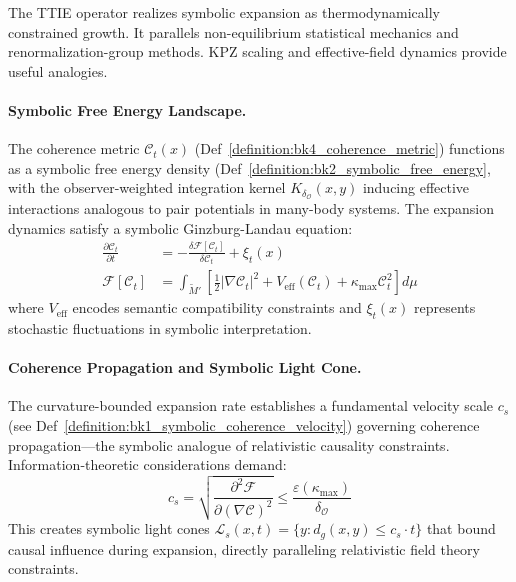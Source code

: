 \begin{demonstratio}
\label{demonstratio:bk4_symbolic_thermodynamics}

The TTIE operator realizes symbolic expansion as thermodynamically constrained
growth.
It parallels non-equilibrium statistical mechanics
and renormalization-group methods.
KPZ scaling and effective-field dynamics provide useful analogies.
  

\paragraph{Symbolic Free Energy Landscape.} 
The coherence metric $\mathcal{C}_t(x)$ (Def~\ref{definition:bk4_coherence_metric}) functions as a symbolic free energy density (Def~\ref{definition:bk2_symbolic_free_energy}, with the observer-weighted integration kernel $K_{\delta_{\mathcal{O}}}(x,y)$ inducing effective interactions analogous to pair potentials in many-body systems. The expansion dynamics satisfy a symbolic Ginzburg-Landau equation:
\begin{align}
\frac{\partial \mathcal{C}_t}{\partial t} &= -\frac{\delta \mathcal{F}[\mathcal{C}_t]}{\delta \mathcal{C}_t} + \xi_t(x) \\[4pt]
\mathcal{F}[\mathcal{C}_t] &= \int_{\widetilde{M}'} \left[ \frac{1}{2}|\nabla \mathcal{C}_t|^2 + V_{\text{eff}}(\mathcal{C}_t) + \kappa_{\max} \mathcal{C}_t^2 \right] d\mu
\end{align}
where $V_{\text{eff}}$ encodes semantic compatibility constraints and $\xi_t(x)$ represents stochastic fluctuations in symbolic interpretation.

\paragraph{Coherence Propagation and Symbolic Light Cone.}
The curvature-bounded expansion rate establishes a fundamental velocity scale $c_s$ (see Def~\ref{definition:bk1_symbolic_coherence_velocity}) governing coherence propagation---the symbolic analogue of relativistic causality constraints. Information-theoretic considerations demand:
\begin{equation}
c_s = \sqrt{\frac{\partial^2 \mathcal{F}}{\partial(\nabla \mathcal{C})^2}} \leq \frac{\varepsilon(\kappa_{\max})}{\delta_{\mathcal{O}}}
\end{equation}
This creates symbolic light cones $\mathcal{L}_s(x,t) = \{y : d_g(x,y) \leq c_s \cdot t\}$ that bound causal influence during expansion, directly paralleling relativistic field theory constraints.


\end{demonstratio}
